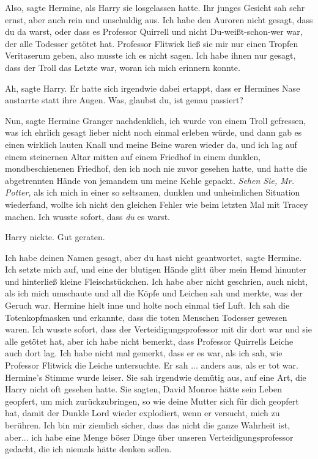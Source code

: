 \glqq{}Also\grqq{}, sagte Hermine, als Harry sie losgelassen hatte. Ihr junges
Gesicht sah sehr ernst, aber auch rein und unschuldig aus. \glqq{}Ich habe den
Auroren nicht gesagt, dass du da warst, oder dass es Professor Quirrell und
nicht Du-weißt-schon-wer war, der alle Todesser getötet hat. Professor Flitwick
ließ sie mir nur einen Tropfen Veritaserum geben, also musste ich es nicht
sagen. Ich habe ihnen nur gesagt, dass der Troll das Letzte war, woran ich mich
erinnern konnte.\grqq{}

\glqq{}Ah\grqq{}, sagte Harry. Er hatte sich irgendwie dabei ertappt, dass er
Hermines Nase anstarrte statt ihre Augen. \glqq{}Was, glaubst du, ist genau
passiert?\grqq{}

\glqq{}Nun\grqq{}, sagte Hermine Granger nachdenklich, \glqq{}ich wurde von einem
Troll gefressen, was ich ehrlich gesagt lieber nicht noch einmal erleben würde,
und dann gab es einen wirklich lauten Knall und meine Beine waren wieder da, und
ich lag auf einem steinernen Altar mitten auf einem Friedhof in einem dunklen,
mondbeschienenen Friedhof, den ich noch nie zuvor gesehen hatte, und hatte die
abgetrennten Hände von jemandem um meine Kehle gepackt. \emph{Sehen Sie, Mr.
Potter,} als ich mich in einer so seltsamen, dunklen und unheimlichen Situation
wiederfand, wollte ich nicht den gleichen Fehler wie beim letzten Mal mit Tracey
machen. Ich wusste sofort, dass \emph{du} es warst.\grqq{}

Harry nickte. \glqq{}Gut geraten.\grqq{}

\glqq{}Ich habe deinen Namen gesagt, aber du hast nicht geantwortet\grqq{}, sagte
Hermine. \glqq{}Ich setzte mich auf, und eine der blutigen Hände glitt über mein
Hemd hinunter und hinterließ kleine Fleischstückchen. Ich habe aber nicht
geschrien, auch nicht, als ich mich umschaute und all die Köpfe und Leichen sah
und merkte, was der Geruch war.\grqq{} Hermine hielt inne und holte noch einmal
tief Luft. \glqq{}Ich sah die Totenkopfmasken und erkannte, dass die toten
Menschen Todesser gewesen waren. Ich wusste sofort, dass der
Verteidigungsprofessor mit dir dort war und sie alle getötet hat, aber ich habe
nicht bemerkt, dass Professor Quirrells Leiche auch dort lag. Ich habe nicht mal
gemerkt, dass er es war, als ich sah, wie Professor Flitwick die Leiche
untersuchte. Er sah ... anders aus, als er tot war.\grqq{} Hermine's Stimme
wurde leiser. Sie sah irgendwie demütig aus, auf eine Art, die Harry nicht oft
gesehen hatte. \glqq{}Sie sagten, David Monroe hätte sein Leben geopfert, um mich
zurückzubringen, so wie deine Mutter sich für dich geopfert hat, damit der
Dunkle Lord wieder explodiert, wenn er versucht, mich zu berühren. Ich bin mir
ziemlich sicher, dass das nicht die ganze Wahrheit ist, aber... ich habe eine
Menge böser Dinge über unseren Verteidigungsprofessor gedacht, die ich niemals
hätte denken sollen.\grqq{}

